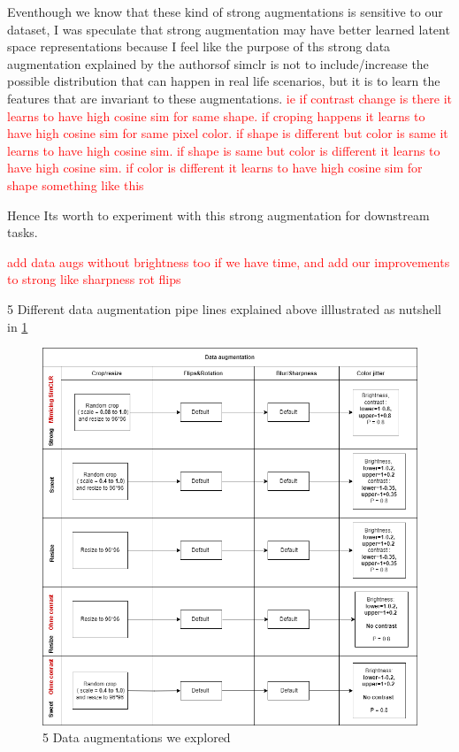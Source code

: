 Eventhough we know that these kind of strong augmentations is sensitive to our dataset, I was speculate that strong augmentation may
 have better learned latent space representations because I feel like the purpose of ths strong data augmentation explained by the authorsof simclr is not to
 include/increase the possible distribution that can happen in real life scenarios, but it is to learn the features that are invariant to these augmentations.
 \textcolor{red}{ie if contrast change is there it learns to have high cosine sim for same shape. if croping happens it learns to have high cosine sim for same pixel 
 color. if shape is different but color is same it learns to have high cosine sim. if shape is same but color is different it learns to have high cosine sim. if  color
  is different it learns to have high cosine sim for shape something like this}

Hence Its worth to experiment with this strong augmentation for downstream tasks.

\textcolor{red}{add data augs without brightness too  if we have time, and add our improvements to strong like sharpness rot flips} 


5 Different data augmentation pipe lines explained above illlustrated as nutshell in \ref{fig:strong_aug}
\begin{figure}[H]
  \centering
  \includegraphics[scale=0.6]{figures/strong_aug.png} 
  \caption{5 Data augmentations we explored}
  \label{fig:strong_aug}
\end{figure}



